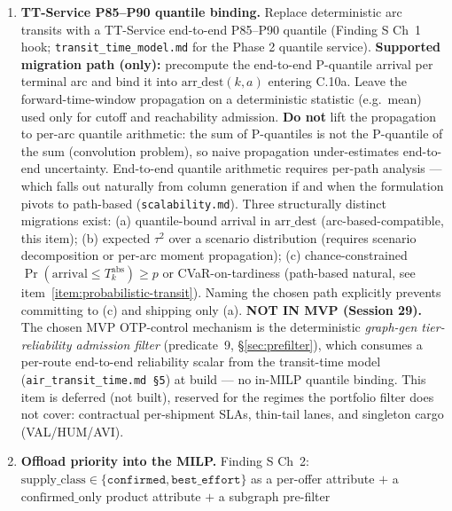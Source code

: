 \documentclass[11pt,a4paper]{article}
\theoremstyle{definition}
\begin{document}
\begin{enumerate}
  \item \label{item:tt-quantile-binding} \textbf{TT-Service P85--P90 quantile
        binding.} Replace deterministic arc transits with a TT-Service
        end-to-end P85--P90 quantile (Finding S Ch~1 hook;
        \texttt{transit\_time\_model.md} for the Phase 2 quantile service).
        \textbf{Supported migration path (only):} precompute the end-to-end
        P-quantile arrival per terminal arc and bind it into
        $\text{arr\_dest}(k, a)$ entering C.10a. Leave the forward-time-window
        propagation on a deterministic statistic (e.g.\ mean) used only for
        cutoff and reachability admission. \textbf{Do not} lift the
        propagation to per-arc quantile arithmetic: the sum of P-quantiles is
        not the P-quantile of the sum (convolution problem), so naive
        propagation under-estimates end-to-end uncertainty. End-to-end
        quantile arithmetic requires per-path analysis --- which falls out
        naturally from column generation if and when the formulation pivots
        to path-based (\texttt{scalability.md}). Three structurally distinct
        migrations exist: (a) quantile-bound arrival in $\text{arr\_dest}$
        (arc-based-compatible, this item); (b) expected $\tau^2$ over a
        scenario distribution (requires scenario decomposition or per-arc
        moment propagation); (c) chance-constrained $\Pr(\text{arrival} \leq
        T_k^{\text{abs}}) \geq p$ or CVaR-on-tardiness (path-based natural,
        see item~\ref{item:probabilistic-transit}). Naming the chosen path
        explicitly prevents committing to (c) and shipping only (a).
        \textbf{NOT IN MVP (Session 29).} The chosen MVP OTP-control mechanism is
        the deterministic \emph{graph-gen tier-reliability admission filter}
        (predicate~9, \S\ref{sec:prefilter}), which consumes a per-route
        end-to-end reliability scalar from the transit-time model
        (\texttt{air\_transit\_time.md \S5}) at build --- no in-MILP quantile
        binding. This item is deferred (not built), reserved for the regimes the
        portfolio filter does not cover: contractual per-shipment SLAs, thin-tail
        lanes, and singleton cargo (VAL/HUM/AVI).
  \item \label{item:offload-priority} \textbf{Offload priority into the
        MILP.} Finding S Ch~2: $\text{supply\_class} \in \{\texttt{confirmed},
        \texttt{best\_effort}\}$ as a per-offer attribute $+$ a
        $\text{confirmed\_only}$ product attribute $+$ a subgraph pre-filter

\end{enumerate}
\end{document}
